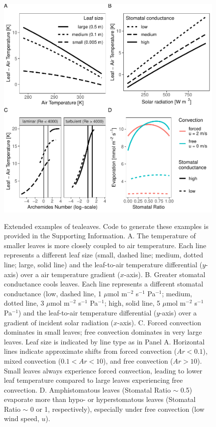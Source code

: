\documentclass[11pt, oneside]{article}
\newcommand{\pkg}[1]{{\fontseries{b}\selectfont #1}}
\newcommand{\tealeaves}{\pkg{tealeaves}}
\begin{document}
\begin{figure}[ht]
\centerline{\includegraphics[width=\textwidth,height=\textwidth]{../figures/fig1.pdf}}
\end{figure}

\begin{figure} [t!]
\caption{Extended examples of \tealeaves. Code to generate these examples is provided in the Supporting Information. A. The temperature of smaller leaves is more closely coupled to air temperature. Each line represents a different leaf size (small, dashed line; medium, dotted line; large, solid line) and the leaf-to-air temperature differential ($y$-axis) over a air temperature gradient ($x$-axis). B. Greater stomatal conductance cools leaves. Each line represents a different stomatal conductance (low, dashed line, 1 $\mu$mol m$^{-2}$ s$^{-1}$ Pa$^{-1}$; medium, dotted line, 3 $\mu$mol m$^{-2}$ s$^{-1}$ Pa$^{-1}$; high, solid line, 5 $\mu$mol m$^{-2}$ s$^{-1}$ Pa$^{-1}$) and the leaf-to-air temperature differential ($y$-axis) over a gradient of incident solar radiation ($x$-axis). C. Forced convection dominates in small leaves; free convection dominates in very large leaves. Leaf size is indicated by line type as in Panel A. Horizontal lines indicate approximate shifts from forced convection ($\mathit{Ar} < 0.1$), mixed convection ($0.1 < \mathit{Ar} < 10$), and free convection ($\mathit{Ar} > 10$). Small leaves always experience forced convection, leading to lower leaf temperature compared to large leaves experiencing free convection. D. Amphistomatous leaves (Stomatal Ratio $\sim$ 0.5) evaporate more than hypo- or hyperstomatous leaves (Stomatal Ratio $\sim$ 0 or 1, respectively), especially under free convection (low wind speed, $u$).}
\label{fig:fig1}
\end{figure}
\end{document}
